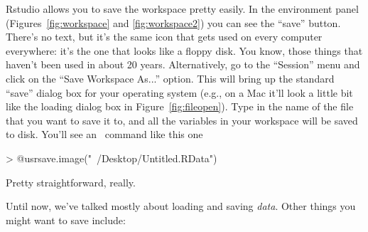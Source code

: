 
Rstudio allows you to save the workspace pretty easily. In the environment panel (Figures~\ref{fig:workspace} and \ref{fig:workspace2}) you can see the ``save'' button. There's no text, but it's the same icon that gets used on every computer everywhere: it's the one that looks like a floppy disk. You know, those things that haven't been used in about 20 years. Alternatively, go to the ``Session'' menu and click on the ``Save Workspace As...'' option. This will bring up the standard ``save'' dialog box for your operating system (e.g., on a Mac it'll look a little bit like the loading dialog box in Figure~\ref{fig:fileopen}). Type in the name of the file that you want to save it to, and all the variables in your workspace will be saved to disk. You'll see an \R\ command like this one
\begin{rblock1}
> @usr{save.image("~/Desktop/Untitled.RData")}
\end{rblock1}
Pretty straightforward, really.




Until now, we've talked mostly about loading and saving {\it data}. Other things you might want to save include:

